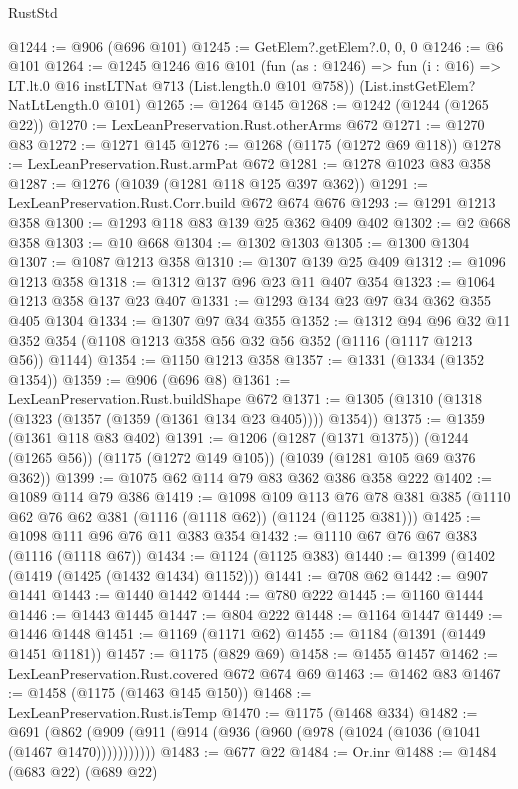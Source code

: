\begin{lexlean}{RustStd}
\begin{coremodule}
@1244 := @906 (@696 @101)
@1245 := GetElem?.getElem?.{0, 0, 0}
@1246 := @6 @101
@1264 := @1245
    @1246
    @16
    @101
    (fun (as : @1246) => fun (i : @16) => LT.lt.{0} @16 instLTNat @713 (List.length.{0} @101 @758))
    (List.instGetElem?NatLtLength.{0} @101)
@1265 := @1264 @145
@1268 := @1242 (@1244 (@1265 @22))
@1270 := LexLeanPreservation.Rust.otherArms @672
@1271 := @1270 @83
@1272 := @1271 @145
@1276 := @1268 (@1175 (@1272 @69 @118))
@1278 := LexLeanPreservation.Rust.armPat @672
@1281 := @1278 @1023 @83 @358
@1287 := @1276 (@1039 (@1281 @118 @125 @397 @362))
@1291 := LexLeanPreservation.Rust.Corr.build @672 @674 @676
@1293 := @1291 @1213 @358
@1300 := @1293 @118 @83 @139 @25 @362 @409 @402
@1302 := @2 @668 @358
@1303 := @10 @668
@1304 := @1302 @1303
@1305 := @1300 @1304
@1307 := @1087 @1213 @358
@1310 := @1307 @139 @25 @409
@1312 := @1096 @1213 @358
@1318 := @1312 @137 @96 @23 @11 @407 @354
@1323 := @1064 @1213 @358 @137 @23 @407
@1331 := @1293 @134 @23 @97 @34 @362 @355 @405 @1304
@1334 := @1307 @97 @34 @355
@1352 := @1312
    @94
    @96
    @32
    @11
    @352
    @354
    (@1108 @1213 @358 @56 @32 @56 @352 (@1116 (@1117 @1213 @56)) @1144)
@1354 := @1150 @1213 @358
@1357 := @1331 (@1334 (@1352 @1354))
@1359 := @906 (@696 @8)
@1361 := LexLeanPreservation.Rust.buildShape @672
@1371 := @1305 (@1310 (@1318 (@1323 (@1357 (@1359 (@1361 @134 @23 @405)))) @1354))
@1375 := @1359 (@1361 @118 @83 @402)
@1391 := @1206
    (@1287 (@1371 @1375))
    (@1244 (@1265 @56))
    (@1175 (@1272 @149 @105))
    (@1039 (@1281 @105 @69 @376 @362))
@1399 := @1075 @62 @114 @79 @83 @362 @386 @358 @222
@1402 := @1089 @114 @79 @386
@1419 := @1098
    @109
    @113
    @76
    @78
    @381
    @385
    (@1110 @62 @76 @62 @381 (@1116 (@1118 @62)) (@1124 (@1125 @381)))
@1425 := @1098 @111 @96 @76 @11 @383 @354
@1432 := @1110 @67 @76 @67 @383 (@1116 (@1118 @67))
@1434 := @1124 (@1125 @383)
@1440 := @1399 (@1402 (@1419 (@1425 (@1432 @1434) @1152)))
@1441 := @708 @62
@1442 := @907 @1441
@1443 := @1440 @1442
@1444 := @780 @222
@1445 := @1160 @1444
@1446 := @1443 @1445
@1447 := @804 @222
@1448 := @1164 @1447
@1449 := @1446 @1448
@1451 := @1169 (@1171 @62)
@1455 := @1184 (@1391 (@1449 @1451 @1181))
@1457 := @1175 (@829 @69)
@1458 := @1455 @1457
@1462 := LexLeanPreservation.Rust.covered @672 @674 @69
@1463 := @1462 @83
@1467 := @1458 (@1175 (@1463 @145 @150))
@1468 := LexLeanPreservation.Rust.isTemp
@1470 := @1175 (@1468 @334)
@1482 := @691 (@862 (@909 (@911 (@914 (@936 (@960 (@978 (@1024 (@1036 (@1041 (@1467 @1470)))))))))))
@1483 := @677 @22
@1484 := Or.inr
@1488 := @1484 (@683 @22) (@689 @22)

\end{coremodule}
\end{lexlean}
